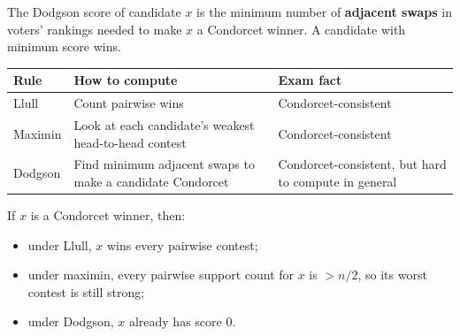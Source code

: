 \begin{defbox}
The Dodgson score of candidate $x$ is the minimum number of \textbf{adjacent swaps} in voters' rankings needed to make $x$ a Condorcet winner. A candidate with minimum score wins.
\end{defbox}

\begin{center}
\renewcommand{\arraystretch}{1.25}
\begin{tabular}{@{}p{2.2cm}p{5.7cm}p{3.3cm}@{}}
\toprule
\textbf{Rule} & \textbf{How to compute} & \textbf{Exam fact} \\
\midrule
Llull & Count pairwise wins & Condorcet-consistent \\
Maximin & Look at each candidate's weakest head-to-head contest & Condorcet-consistent \\
Dodgson & Find minimum adjacent swaps to make a candidate Condorcet & Condorcet-consistent, but hard to compute in general \\
\bottomrule
\end{tabular}
\end{center}

\begin{tipbox}
If $x$ is a Condorcet winner, then:
\begin{itemize}
  \item under Llull, $x$ wins every pairwise contest;
  \item under maximin, every pairwise support count for $x$ is $> n/2$, so its worst contest is still strong;
  \item under Dodgson, $x$ already has score 0.
\end{itemize}
\end{tipbox}

